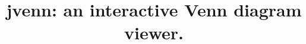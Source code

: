 \documentclass{bmcart}
\begin{document}
\sloppy

\begin{frontmatter}

\begin{fmbox}


\title{jvenn: an interactive Venn diagram viewer.}


\author[
   addressref={aff2},                   %
   noteref={n1},                        %
   email={Philippe.Bardou@toulouse.inra.fr}   %
]{ }
\author[
   addressref={aff1},
   corref={aff1},                       %
   noteref={n1},                        %
   email={Jerome.Mariette@toulouse.inra.fr}
]{ }
\author[
   addressref={aff1},
   email={Frederic.Escudie@toulouse.inra.fr}
]{ }
\author[
   addressref={aff1},
   email={Christophe.Djemiel@toulouse.inra.fr}
]{ }
\author[
   addressref={aff1,aff2},
   email={Christophe.Klopp@toulouse.inra.fr}
]{ }



\end{fmbox}
\end{frontmatter}
\end{document}
